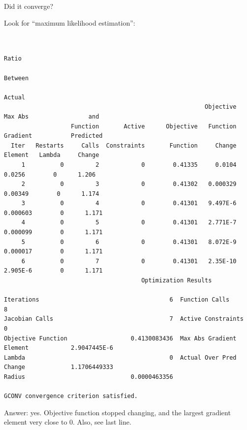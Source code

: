 \documentclass[pdf]{prosper}
\begin{document}
  \begin{slide}{Did it converge?}

Look for ``maximum likelihood estimation'':

{\tiny
\begin{verbatim}

                                                                                           Ratio
                                                                                         Between
                                                                                          Actual
                                                         Objective   Max Abs                 and
                   Function       Active      Objective   Function  Gradient           Predicted
  Iter   Restarts     Calls  Constraints       Function     Change   Element   Lambda     Change
     1          0         2            0        0.41335     0.0104    0.0256        0      1.206
     2          0         3            0        0.41302   0.000329   0.00349        0      1.174
     3          0         4            0        0.41301   9.497E-6  0.000603        0      1.171
     4          0         5            0        0.41301   2.771E-7  0.000099        0      1.171
     5          0         6            0        0.41301   8.072E-9  0.000017        0      1.171
     6          0         7            0        0.41301   2.35E-10  2.905E-6        0      1.171
                                       Optimization Results

Iterations                                     6  Function Calls                                 8
Jacobian Calls                                 7  Active Constraints                             0
Objective Function                  0.4130083436  Max Abs Gradient Element            2.9047445E-6
Lambda                                         0  Actual Over Pred Change             1.1706449333
Radius                              0.0000463356

GCONV convergence criterion satisfied.

\end{verbatim}
}

Answer: yes. Objective function stopped changing, and the largest gradient element very close to 0. Also, see last line.
    
  \end{slide}
\end{document}
